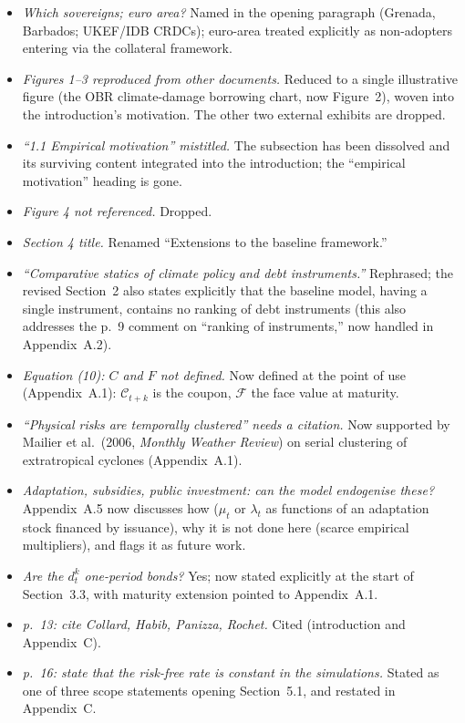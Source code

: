\documentclass[11pt]{article}
\newcounter{comment}
\begin{document}
\begin{itemize}
\item \emph{Which sovereigns; euro area?} Named in the opening paragraph (Grenada, Barbados; UKEF/IDB CRDCs); euro-area treated explicitly as non-adopters entering via the collateral framework.
\item \emph{Figures 1--3 reproduced from other documents.} Reduced to a single illustrative figure (the OBR climate-damage borrowing chart, now Figure~2), woven into the introduction's motivation. The other two external exhibits are dropped.
\item \emph{``1.1 Empirical motivation'' mistitled.} The subsection has been dissolved and its surviving content integrated into the introduction; the ``empirical motivation'' heading is gone.
\item \emph{Figure 4 not referenced.} Dropped.
\item \emph{Section 4 title.} Renamed ``Extensions to the baseline framework.''
\item \emph{``Comparative statics of climate policy and debt instruments.''} Rephrased; the revised Section~2 also states explicitly that the baseline model, having a single instrument, contains no ranking of debt instruments (this also addresses the p.~9 comment on ``ranking of instruments,'' now handled in Appendix~A.2).
\item \emph{Equation (10): $C$ and $F$ not defined.} Now defined at the point of use (Appendix~A.1): $\mathcal{C}_{t+k}$ is the coupon, $\mathcal{F}$ the face value at maturity.
\item \emph{``Physical risks are temporally clustered'' needs a citation.} Now supported by Mailier et al.\ (2006, \emph{Monthly Weather Review}) on serial clustering of extratropical cyclones (Appendix~A.1).
\item \emph{Adaptation, subsidies, public investment: can the model endogenise these?} Appendix~A.5 now discusses how ($\mu_t$ or $\lambda_t$ as functions of an adaptation stock financed by issuance), why it is not done here (scarce empirical multipliers), and flags it as future work.
\item \emph{Are the $d^k_t$ one-period bonds?} Yes; now stated explicitly at the start of Section~3.3, with maturity extension pointed to Appendix~A.1.
\item \emph{p.~13: cite Collard, Habib, Panizza, Rochet.} Cited (introduction and Appendix~C).
\item \emph{p.~16: state that the risk-free rate is constant in the simulations.} Stated as one of three scope statements opening Section~5.1, and restated in Appendix~C.

\end{itemize}
\end{document}
